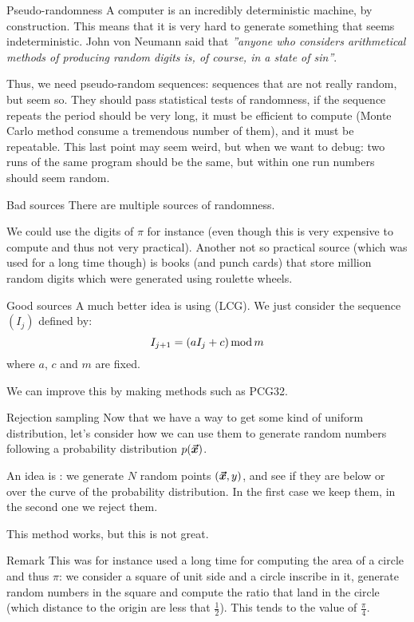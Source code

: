 \documentclass[a4paper]{article}
\begin{document}
\begin{parag}{Pseudo-randomness}
    A computer is an incredibly deterministic machine, by construction. This means that it is very hard to generate something that seems indeterministic. John von Neumann said that \textit{''anyone who considers arithmetical methods of producing random digits is, of course, in a state of sin''}.

    Thus, we need pseudo-random sequences: sequences that are not really random, but seem so. They should pass statistical tests of randomness, if the sequence repeats the period should be very long, it must be efficient to compute (Monte Carlo method consume a tremendous number of them), and it must be repeatable. This last point may seem weird, but when we want to debug: two runs of the same program should be the same, but within one run numbers should seem random.

    \begin{subparag}{Bad sources}
        There are multiple sources of randomness.

        We could use the digits of $\pi$ for instance (even though this is very expensive to compute and thus not very practical). Another not so practical source (which was used for a long time though) is books (and punch cards) that store million random digits which were generated using roulette wheels.
    \end{subparag}
    

    \begin{subparag}{Good sources}
        A much better idea is using  (LCG). We just consider the sequence $\left(I_j\right)$ defined by:
        \[I_{j+1} = \left(a I_j + c\right) \Mod m\]
        where $a$, $c$ and $m$ are fixed.
        
        We can improve this by making methods such as PCG32.
    \end{subparag}
\end{parag}

\begin{parag}{Rejection sampling}
    Now that we have a way to get some kind of uniform distribution, let's consider how we can use them to generate random numbers following a probability distribution $p\left(\bvec{x}\right)$.

    An idea is : we generate $N$ random points $\left(\bvec{x}, y\right)$, and see if they are below or over the curve of the probability distribution. In the first case we keep them, in the second one we reject them.
    
    This method works, but this is not great.

    \begin{subparag}{Remark}
        This was for instance used a long time for computing the area of a circle and thus $\pi$: we consider a square of unit side and a circle inscribe in it, generate random numbers in the square and compute the ratio that land in the circle (which distance to the origin are less that $\frac{1}{2}$). This tends to the value of $\frac{\pi}{4}$.
    \end{subparag}
\end{parag}
\end{document}
